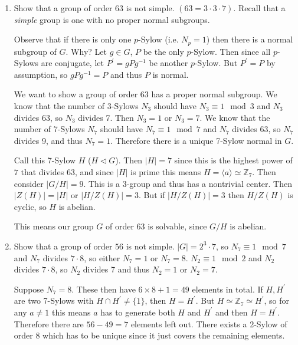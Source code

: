 \begin{xmpl}
\begin{enumerate}
  \item{
    Show that a group of order 63 is not simple.
    $(63 = 3 \cdot 3 \cdot 7)$. Recall that a \emph{simple} group is
    one with no proper normal subgroups.

    Observe that if there is only one $p$-Sylow (i.e. $N_p = 1$) then
    there is a normal subgroup of $G$. Why? Let $g \in G$, $P$ be
    the only $p$-Sylow. Then since all $p$-Sylows are conjugate, let
    $P^\prime = gPg^{-1}$ be another $p$-Sylow. But $P^\prime = P$ by
    assumption, so $gPg^{-1} = P$ and thus $P$ is normal.

    We want to show a group of order 63 has a proper normal subgroup.
    We know that the number of 3-Sylows $N_3$ should have
    $N_3 \equiv 1 \mod 3$ and $N_3$ divides 63, so $N_3$ divides
    7. Then $N_3 = 1$ or $N_3 = 7$. We know that the number of
    7-Sylows $N_7$ should have $N_7 \equiv 1 \mod 7$ and $N_7$ divides
    63, so $N_7$ divides 9, and thus $N_7 = 1$. Therefore there is a
    unique 7-Sylow normal in $G$.

    Call this 7-Sylow $H$ ($H \triangleleft G$). Then $|H| = 7$ since
    this is the highest power of $7$ that divides 63, and since $|H|$
    is prime this means
    $H = \langle a \rangle \simeq \mathbb{Z}_7$. Then
    consider $|G / H| = 9$. This is a $3$-group and thus has a
    nontrivial center.
    Then $|Z(H)| = |H|$ or $|H / Z(H)| = 3$. But if $|H / Z(H)| = 3$ then
    $H / Z(H)$ is cyclic, so $H$ is abelian.

    This means our group $G$ of order 63 is solvable, since $G / H$ is abelian.
  }
  \item{
    Show that a group of order $56$ is not simple.
    $|G| = 2^3 \cdot 7$, so $N_7 \equiv 1 \mod 7$ and $N_7$ divides $7
    \cdot 8$, so either $N_7 = 1$ or $N_7 = 8$. $N_2 \equiv 1 \mod 2$
    and $N_2$ divides $7 \cdot 8$, so $N_2$ divides 7 and thus $N_2 =
    1$ or $N_2 = 7$.

    Suppose $N_7 = 8$. These then have $6 \times 8 + 1 = 49$ elements
    in total. If $H, H^\prime$ are two 7-Sylows with $H \cap H^\prime
    \neq \{ 1 \}$, then $H = H^\prime$. But $H \simeq \mathbb{Z}_7
    \simeq H^\prime$, so for any $a \neq 1$ this means $a$ has to
    generate both $H$ and $H^\prime$ and then $H =
    H^\prime$. Therefore there are $56 - 49 = 7$ elements left
    out. There exists a 2-Sylow of order 8 which has to be unique
    since it just covers the remaining elements.

}
\end{enumerate}
\end{xmpl}
